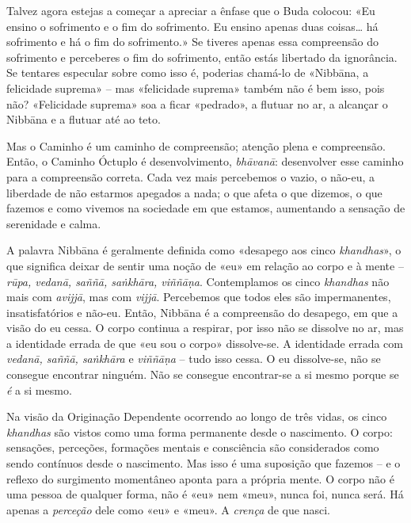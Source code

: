 Talvez agora estejas a começar a apreciar a ênfase que o Buda colocou: «Eu
ensino o sofrimento e o fim do sofrimento. Eu ensino apenas duas coisas\ldots{}
há sofrimento e há o fim do sofrimento.» Se tiveres apenas essa compreensão do
sofrimento e perceberes o fim do sofrimento, então estás libertado da
ignorância. Se tentares especular sobre como isso é, poderias chamá-lo de
«Nibbāna, a felicidade suprema» -- mas «felicidade suprema» também não é bem
isso, pois não? «Felicidade suprema» soa a ficar «pedrado», a flutuar no ar, a
alcançar o Nibbāna e a flutuar até ao teto.

Mas o Caminho é um caminho de compreensão; atenção plena e compreensão. Então, o
Caminho Óctuplo é desenvolvimento, \emph{bhāvanā}: desenvolver esse caminho para
a compreensão correta. Cada vez mais percebemos o vazio, o não-eu, a liberdade
de não estarmos apegados a nada; o que afeta o que dizemos, o que fazemos e como
vivemos na sociedade em que estamos, aumentando a sensação de serenidade e
calma.

A palavra Nibbāna é geralmente definida como «desapego aos cinco
\emph{khandhas}», o que significa deixar de sentir uma noção de «eu» em relação
ao corpo e à mente -- \emph{rūpa, vedanā, saññā, saṅkhāra, viññāṇa}.
Contemplamos os cinco \emph{khandhas} não mais com \emph{avijjā}, mas com
\emph{vijjā}. Percebemos que todos eles são impermanentes, insatisfatórios e
não-eu. Então, Nibbāna é a compreensão do desapego, em que a visão do eu cessa.
O corpo continua a respirar, por isso não se dissolve no ar, mas a identidade
errada de que «eu sou o corpo» dissolve-se. A identidade errada com
\emph{vedanā, saññā, saṅkhāra} e \emph{viññāṇa} -- tudo isso cessa. O eu
dissolve-se, não se consegue encontrar ninguém. Não se consegue encontrar-se a
si mesmo porque se \emph{é} a si mesmo.

Na visão da Originação Dependente ocorrendo ao longo de três vidas, os cinco
\emph{khandhas} são vistos como uma forma permanente desde o nascimento. O
corpo: sensações, perceções, formações mentais e consciência são considerados
como sendo contínuos desde o nascimento. Mas isso é uma suposição que fazemos --
e o reflexo do surgimento momentâneo aponta para a própria mente. O corpo não é
uma pessoa de qualquer forma, não é «eu» nem «meu», nunca foi, nunca será. Há
apenas a \emph{perceção} dele como «eu» e «meu». A \emph{crença} de que nasci.

